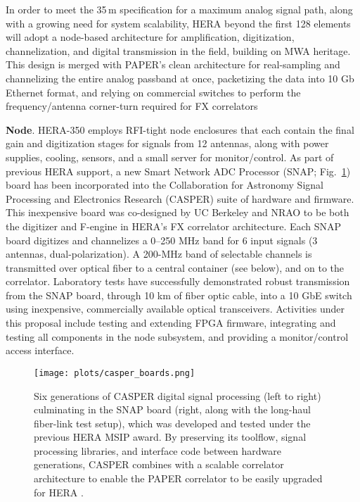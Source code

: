 \documentclass[preprint,11pt]{aastex}
\newcommand{\Mycitep}[1]{\citep{#1}}
\begin{document}
In order to meet the 35\,m specification for a maximum analog signal path, along with a growing need for system scalability, HERA beyond the first 128 elements will adopt a node-based architecture for amplification, digitization, channelization, and digital
transmission in the field, building on MWA heritage. This design is merged with PAPER's clean 
architecture for real-sampling and channelizing the entire analog passband at once, packetizing the data into
10 Gb Ethernet format, and relying on commercial switches to perform the frequency/antenna corner-turn required for FX correlators

{\bf Node}. HERA-350 employs RFI-tight node enclosures that each contain the final gain and digitization stages for
signals from 12 antennas, along with power supplies, cooling, sensors, and a small server for monitor/control.  
As part of previous HERA support,
a new Smart Network ADC Processor (SNAP; Fig.~\ref{fig:hardware}) board has been incorporated 
into the Collaboration for Astronomy Signal Processing and Electronics Research (CASPER) suite of hardware and firmware. This inexpensive board was co-designed by UC Berkeley and NRAO to be
both the digitizer and F-engine in HERA's FX correlator architecture.
Each SNAP board 
digitizes and channelizes a 0--250 MHz band for 6 input signals (3 antennas, dual-polarization).
A 200-MHz band of selectable channels is transmitted over optical fiber
to a central container (see below), and on to the correlator.  Laboratory
tests have successfully demonstrated robust transmission from the SNAP board, through 10 km of fiber optic cable, 
into a 10 GbE switch using inexpensive, commercially available optical transceivers.
Activities under this proposal include 
testing and extending FPGA firmware,
integrating and testing all components in the node subsystem, and providing a monitor/control
access interface.

\begin{figure}[t]
\centering
\vspace{-5pt}
\texttt{[image: plots/casper\_boards.png]}
\vspace{-20pt}
\caption{
Six generations of CASPER digital signal processing (left to right) culminating in the SNAP board (right, along with the long-haul fiber-link test setup), which was developed and tested under the previous HERA MSIP award.
By preserving its toolflow, signal processing libraries, and interface code between hardware generations,
CASPER combines with a scalable correlator architecture to enable the PAPER correlator to be 
easily upgraded for HERA \Mycitep{parsons_et_al2006,parsons_et_al2008}.
%
}\label{fig:hardware}
\vspace{-10pt}
\end{figure}
\end{document}
